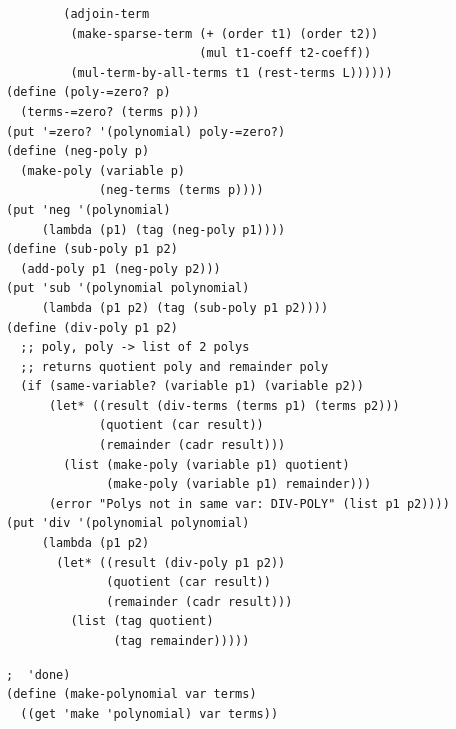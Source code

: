 \documentclass[final,fleqn,titlepage,twoside]{article}
\begin{document}
\begin{verbatim}
        (adjoin-term
         (make-sparse-term (+ (order t1) (order t2))
                           (mul t1-coeff t2-coeff))
         (mul-term-by-all-terms t1 (rest-terms L))))))
(define (poly-=zero? p)
  (terms-=zero? (terms p)))
(put '=zero? '(polynomial) poly-=zero?)
(define (neg-poly p)
  (make-poly (variable p)
             (neg-terms (terms p))))
(put 'neg '(polynomial)
     (lambda (p1) (tag (neg-poly p1))))
(define (sub-poly p1 p2)
  (add-poly p1 (neg-poly p2)))
(put 'sub '(polynomial polynomial)
     (lambda (p1 p2) (tag (sub-poly p1 p2))))
(define (div-poly p1 p2)
  ;; poly, poly -> list of 2 polys
  ;; returns quotient poly and remainder poly
  (if (same-variable? (variable p1) (variable p2))
      (let* ((result (div-terms (terms p1) (terms p2)))
             (quotient (car result))
             (remainder (cadr result)))
        (list (make-poly (variable p1) quotient)
              (make-poly (variable p1) remainder)))
      (error "Polys not in same var: DIV-POLY" (list p1 p2))))
(put 'div '(polynomial polynomial)
     (lambda (p1 p2)
       (let* ((result (div-poly p1 p2))
              (quotient (car result))
              (remainder (cadr result)))
         (list (tag quotient)
               (tag remainder)))))
\end{verbatim}
\begin{verbatim}
;  'done)
(define (make-polynomial var terms)
  ((get 'make 'polynomial) var terms))
\end{verbatim}
\end{document}
